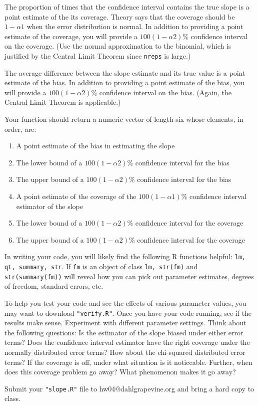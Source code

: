 \documentclass[12pt]{article}
\begin{document}
The proportion of times that the confidence interval contains the true slope is a point estimate of the its coverage. Theory says that the coverage should be $1-\alpha1$ when the error distribution is normal. In addition to providing a point estimate of the coverage, you will provide a $100(1-\alpha2)$\% confidence interval on the coverage. (Use the normal approximation to the binomial, which is justified by the Central Limit Theorem since \texttt{nreps} is large.)

The average difference between the slope estimate and its true value is a point estimate of the bias. In addition to providing a point estimate of the bias, you will provide a $100(1-\alpha2)$\% confidence interval on the bias. (Again, the Central Limit Theorem is applicable.)

Your function should return a numeric vector of length six whose elements, in order, are:
\begin{enumerate}
\item A point estimate of the bias in estimating the slope
\item The lower bound of a $100(1-\alpha2)$\% confidence interval for the bias
\item The upper bound of a $100(1-\alpha2)$\% confidence interval for the bias
\item A point estimate of the coverage of the $100(1-\alpha1)$\% confidence interval estimator of the slope
\item The lower bound of a $100(1-\alpha2)$\% confidence interval for the coverage
\item The upper bound of a $100(1-\alpha2)$\% confidence interval for the coverage
\end{enumerate}

In writing your code, you will likely find the following R functions helpful: \texttt{lm, qt, summary, str}. If \texttt{fm} is an object of class \texttt{lm, str(fm)} and \texttt{str(summary(fm))} will reveal how you can pick out parameter estimates, degrees of freedom, standard errors, etc.

To help you test your code and see the effects of various parameter values, you may want to download \texttt{"verify.R"}. Once you have your code running, see if the results make sense. Experiment with different parameter settings. Think about the following questions: Is the estimator of the slope biased under either error terms? Does the confidence interval estimator have the right coverage under the normally distributed error terms? How about the chi-squared distributed error terms? If the coverage is off, under what situation is it noticeable. Further, when does this coverage problem go away? What phenomenon makes it go away?

Submit your \texttt{"slope.R"} file to hw04@dahlgrapevine.org and bring a hard copy to class.
\end{document}
